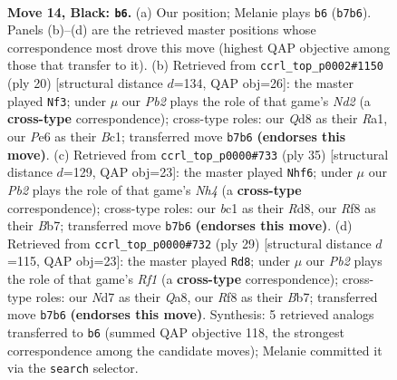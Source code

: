 \documentclass[11pt]{article}
\begin{document}
\clearpage

\begin{figure}[p]\centering
\begin{subfigure}{0.46\textwidth}\centering
\resizebox{\linewidth}{!}{%
\newchessgame
\chessboard[
  setfen={rnbq1rk1/pp1nb3/4p1p1/6P1/P2P4/2N2N2/1P3P2/R1BQKB1R b KQ - 0 14},
  showmover=false,
  pgfstyle=straightmove, color=movearrow, markmove={b7-b6}
]}
\caption{}
\end{subfigure}\hfill
\begin{subfigure}{0.46\textwidth}\centering
\resizebox{\linewidth}{!}{%
\newchessgame
\chessboard[
  setfen={r1bqk2r/pp4pp/2nbpn2/3p4/3P4/3B4/PP1NNPPP/R1BQ1RK1 w kq - 2 11},
  showmover=false,
  pgfstyle=straightmove, color=movearrow, markmove={d2-f3}
]}
\caption{}
\end{subfigure}
\\[4pt]
\begin{subfigure}{0.46\textwidth}\centering
\resizebox{\linewidth}{!}{%
\newchessgame
\chessboard[
  setfen={q2r2k1/1b1nbpp1/4p2p/1B5n/3P4/2N1BN2/1P2QPPP/3R2K1 b - - 3 18},
  showmover=false,
  pgfstyle=straightmove, color=movearrow, markmove={h5-f6}
]}
\caption{}
\end{subfigure}\hfill
\begin{subfigure}{0.46\textwidth}\centering
\resizebox{\linewidth}{!}{%
\newchessgame
\chessboard[
  setfen={q4rk1/1b1nbppp/4pn2/1B6/3P4/2N2N2/1P2QPPP/2BR2K1 b - - 2 15},
  showmover=false,
  pgfstyle=straightmove, color=movearrow, markmove={f8-d8}
]}
\caption{}
\end{subfigure}
\caption{\textbf{Move 14, Black: \texttt{b6}.} (a) Our position; Melanie plays \texttt{b6} (\texttt{b7b6}). Panels (b)--(d) are the retrieved master positions whose correspondence most drove this move (highest QAP objective among those that transfer to it). (b) Retrieved from \texttt{ccrl\_top\_p0002\#1150} (ply 20) [structural distance $d$=134, QAP obj=26]: the master played \texttt{Nf3}; under $\mu$ our \emph{Pb2} plays the role of that game's \emph{Nd2} (a \textbf{cross-type} correspondence); cross-type roles: our \emph{Q}d8 as their \emph{R}a1, our \emph{P}e6 as their \emph{B}c1; transferred move \texttt{b7b6} \textbf{(endorses this move)}. (c) Retrieved from \texttt{ccrl\_top\_p0000\#733} (ply 35) [structural distance $d$=129, QAP obj=23]: the master played \texttt{Nhf6}; under $\mu$ our \emph{Pb2} plays the role of that game's \emph{Nh4} (a \textbf{cross-type} correspondence); cross-type roles: our \emph{b}c1 as their \emph{R}d8, our \emph{R}f8 as their \emph{B}b7; transferred move \texttt{b7b6} \textbf{(endorses this move)}. (d) Retrieved from \texttt{ccrl\_top\_p0000\#732} (ply 29) [structural distance $d$=115, QAP obj=23]: the master played \texttt{Rd8}; under $\mu$ our \emph{Pb2} plays the role of that game's \emph{Rf1} (a \textbf{cross-type} correspondence); cross-type roles: our \emph{N}d7 as their \emph{Q}a8, our \emph{R}f8 as their \emph{B}b7; transferred move \texttt{b7b6} \textbf{(endorses this move)}. Synthesis: 5 retrieved analogs transferred to \texttt{b6} (summed QAP objective 118, the strongest correspondence among the candidate moves); Melanie committed it via the \texttt{search} selector.}
\label{fig:thought-m27}
\end{figure}
\end{document}
